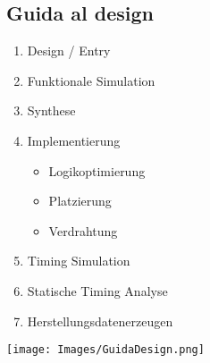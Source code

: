     \subsection{Guida al design}
        \begin{minipage}[t]{0.48\columnwidth}
            \vspace{0pt} %
            \begin{enumerate}
                \item Design / Entry
                \item Funktionale Simulation
                \item Synthese
                \item Implementierung
                \begin{itemize}
                    \item Logikoptimierung
                    \item Platzierung
                    \item Verdrahtung
                \end{itemize}
                \item Timing Simulation
                \item Statische Timing Analyse
                \item Herstellungsdatenerzeugen
            \end{enumerate}
        \end{minipage}
        \hfill
        \begin{minipage}[t]{0.48\columnwidth}
            \vspace{0pt} %
            \texttt{[image: Images/GuidaDesign.png]}
        \end{minipage}